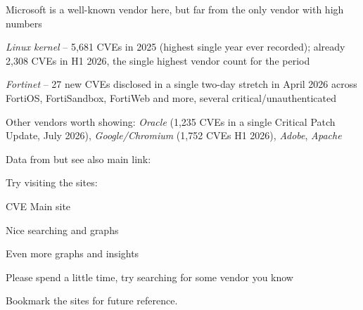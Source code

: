 \documentclass[Screen16to9,17pt]{foils}
\begin{document}
\begin{list2}
\item Microsoft is a well-known vendor here, but far from the only vendor with high numbers
\item \emph{Linux kernel} -- 5{,}681 CVEs in 2025 (highest single year ever recorded); already 2{,}308 CVEs in H1 2026, the single highest vendor count for the period\\
\item \emph{Fortinet} -- 27 new CVEs disclosed in a single two-day stretch in April 2026 across FortiOS, FortiSandbox, FortiWeb and more, several critical/unauthenticated\\
\item Other vendors worth showing: \emph{Oracle} (1{,}235 CVEs in a single Critical Patch Update, July 2026), \emph{Google/Chromium} (1{,}752 CVEs H1 2026), \emph{Adobe}, \emph{Apache}
\end{list2}



Data from  but see also main link: 


Try visiting the sites:
\begin{list2}
\item CVE Main site 
\item Nice searching and graphs 
\item Even more graphs and insights 
\end{list2}

Please spend a little time, try searching for some vendor you know

Bookmark the sites for future reference.


\breakdance

\end{document}
